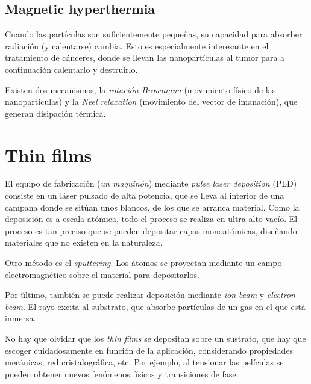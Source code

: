 \documentclass{tufte-book}
\begin{document}
\subsection{Magnetic hyperthermia}
Cuando las partículas son suficientemente pequeñas, su capacidad para
absorber radiación (y calentarse) cambia. Esto es especialmente
interesante en el tratamiento de cánceres, donde se llevan las
nanopartículas al tumor para a continuación calentarlo y destruirlo.

Existen dos mecanismos, la \emph{rotación Browniana} (movimiento
físico de las nanopartículas) y la \emph{Neel relaxation} (movimiento
del vector de imanación), que generan disipación térmica.

\section{Thin films}

El equipo de fabricación (\emph{un maquinón}) mediante \emph{pulse
  laser deposition} (PLD) consiste en un láser pulsado de alta potencia,
que se lleva al interior de una campana donde se sitúan unos blancos,
de los que se arranca material. Como la deposición es a escala
atómica, todo el proceso se realiza en ultra alto vacío.
El proceso es tan preciso que se pueden depositar capas monoatómicas,
diseñando materiales que no existen en la naturaleza.

Otro método es el \emph{sputtering}. Los átomos se proyectan mediante
un campo electromagnético sobre el material para depositarlos.

Por último, también se puede realizar deposición mediante \emph{ion
  beam} y \emph{electron beam}. El rayo excita al substrato, que
absorbe partículas de un gas en el que está inmersa.

No hay que olvidar que los \textit{thin films} se depositan sobre un
sustrato, que hay que escoger cuidadosamente en función de la
aplicación, considerando propiedades mecánicas, red cristalográfica,
etc. Por ejemplo, al tensionar las películas se pueden obtener nuevos
fenómenos físicos y transiciones de fase.
\end{document}

